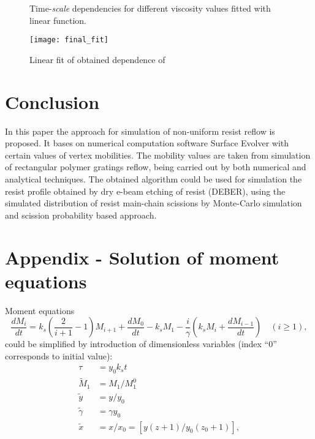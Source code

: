 \documentclass[12pt, letterpaper]{article}
\begin{document}
\begin{figure}[h!]
	\vspace{-4em}
	
	\caption{Time-\textit{scale} dependencies for different viscosity values fitted with linear function.}
	\label{fig:alphas}
\end{figure}


\begin{figure}
	\begin{center}
		\texttt{[image: final\_fit]}
	\end{center}
	
	\vspace{-2em}
	
	\caption{Linear fit of obtained dependence of }
	\label{fig:final_fit}
\end{figure}


\section{Conclusion}
In this paper the approach for simulation of non-uniform resist reflow is proposed. It bases on numerical computation software Surface Evolver with certain values of vertex mobilities. The mobility values are taken from simulation of rectangular polymer gratings reflow, being carried out by both numerical and analytical techniques. The obtained algorithm could be used for simulation the resist profile obtained by dry e-beam etching of resist (DEBER), using the simulated distribution of resist main-chain scissions by Monte-Carlo simulation and scission probability based approach.





\clearpage
\section{Appendix - Solution of moment equations}
Moment equations
\begin{equation}
	\frac{d M_i}{d t}=k_s(\frac{2}{i+1}-1) M_{i+1}+\frac{d M_0}{d t}-k_s M_1 - \frac{i}{\gamma}(k_s M_i+\frac{d M_{i-1}}{d t}) \quad(i \geq 1),
\end{equation}
 could be simplified by introduction of dimensionless variables (index ``0'' corresponds to initial value):
\begin{equation} \label{eq:dim_less_MW}
	\begin{aligned}
		\tau & = y_0 k_s t \\
		\tilde{M}_1 & = M_1 / M_1^0 \\
		\tilde{y} & = y / y_0 \\
		\tilde{\gamma} & = \gamma y_0 \\
		\tilde{x} & = x / x_0 = \left[y(z+1) / y_0(z_0+1)\right],
	\end{aligned}
\end{equation}
\end{document}
